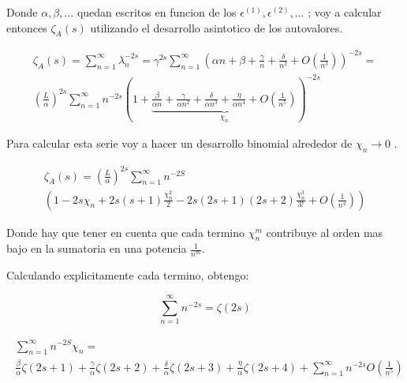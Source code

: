 Donde $\alpha, \beta , ... $ quedan escritos en funcion de los $\epsilon ^{(1)},\epsilon^{(2)}, ... $ ; 
voy a calcular entonces $\zeta _A (s) $ utilizando el desarrollo asintotico de los autovalores.
    
\begin{equation}
\begin{array}{cc}
    \zeta _{A} (s) =  \sum _{n=1} ^{\infty} \lambda _n ^ {-2 s} =
    \gamma ^{2s}
    \sum _{n=1} ^{\infty} 
    \left(
    \alpha n + 
    \beta + 
    \frac{\gamma}{n} +
    \frac{\delta}{n ^2} +
    O( \frac{1}{n ^{3} }  )
    \right) ^{-2 s} = \\
    ( \frac{L}{\alpha} ) ^{2s}    
    \sum _{n=1} ^{\infty} 
    n ^{- 2 s} 
    \left(
    1 +     
    \underbrace{
        \frac{\beta}{\alpha n} + 
        \frac{\gamma}{\alpha n^2} +
        \frac{\delta}{\alpha n ^3} +
        \frac{\eta}{\alpha n^4} +
        O(\frac{1}{n ^{5}} ) } _{ \chi _n}
    \right ) ^{-2 s}
\end{array}
\end{equation}

Para calcular esta serie voy a hacer un desarrollo binomial alrededor de $\chi _n \rightarrow{0} $  .

\begin{equation}
\begin{array}{c}
\zeta _{A} (s) = 
( \frac{L}{\alpha} ) ^{2s}
\sum _{n=1} ^{\infty}
  n  ^{-2 S} \\
(
1 - 2 s \chi _n + 2 s(s+1) \frac{\chi _n ^2}{2} - 2s(2s+1)(2s+2) \frac{ \chi _n ^3}{3!}  + O( \frac{1}{n ^4}) )

\end{array}
\end{equation}

Donde hay que tener en cuenta que cada termino $\chi _{n} ^{m} $ contribuye al orden mas bajo en la sumatoria en una potencia $\frac{1}{n ^m}$.


Calculando explicitamente cada termino, obtengo:

\begin{equation}
\sum _{n=1} ^{\infty} n ^{-2 s} = \zeta (2s)
\end{equation}


\begin{equation}
\begin{array}{c}
\begin{array}{c}
\sum _{n=1} ^{\infty}
 n  ^{-2 S}  \chi _n =  \\
\frac{\beta}{\alpha} \zeta (2s+1) + 
\frac{\gamma}{\alpha} \zeta(2s+2) + 
\frac{\delta}{\alpha} \zeta(2s+3) +
\frac{\eta}{\alpha} \zeta (2s+4) + 
\sum _{n=1} ^{\infty} n ^{-2s} O(\frac{1}{n ^5})
\end{array}
\end{array}
\end{equation}

